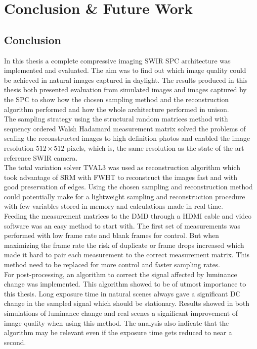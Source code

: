 \chapter{Conclusion \& Future Work}
\label{sec:conclusions_and_fw}
\section{Conclusion}
\label{sec:conclusion}

In this thesis a complete compressive imaging SWIR SPC architecture was implemented and evaluated. The aim was to find out which image quality could be achieved in natural images captured in daylight. The results produced in this thesis both presented evaluation from simulated images and images captured by the SPC to show how the chosen sampling method and the reconstruction algorithm performed and how the whole architecture performed in unison.\\[0.1in]

The sampling strategy using the structural random matrices method with sequency ordered Walsh Hadamard measurement matrix solved the problems of scaling the reconstructed images to high definition photos and enabled the image resolution $512 \times 512$ pixels, which is, the same resolution as the state of the art reference SWIR camera.\\[0.1in]

The total variation solver TVAL3 was used as reconstruction algorithm  which took advantage of SRM with FWHT to reconstruct the images fast and with good preservation of edges. Using the chosen sampling and reconstruction method could potentially make for a lightweight sampling and reconstruction procedure with few variables stored in memory and calculations made in real time.\\[0.1in]

Feeding the measurement matrices to the DMD through a HDMI cable and video software was an easy method to start with. The first set of measurements was performed with low frame rate and blank frames for control. But when maximizing the frame rate the risk of duplicate or frame drops increased which made it hard to pair each measurement to the correct measurement matrix. This method need to be replaced for more control and faster sampling rates.\\[0.1in]

For post-processing, an algorithm to correct the signal affected by luminance change was implemented. This algorithm showed to be of utmost importance to this thesis. Long exposure time in natural scenes always gave a significant DC change in the sampled signal which should be stationary. Results showed in both simulations of luminance change and real scenes a significant improvement of image quality when using this method. The analysis also indicate that the algorithm may be relevant even if the exposure time gets reduced to near a second.\\[0.1in]

